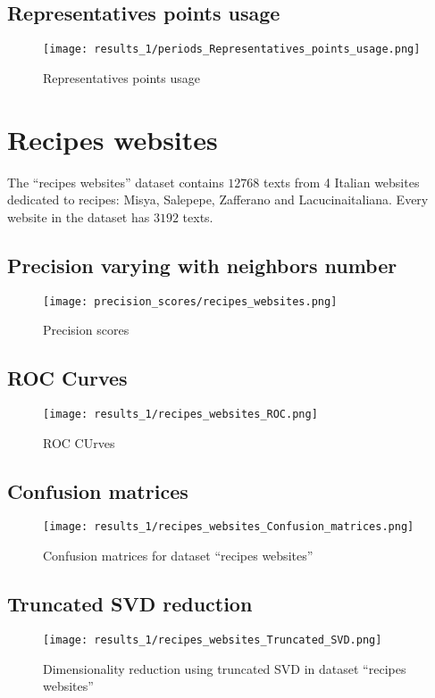\documentclass[\main/main.tex]{subfiles}
\begin{document}
\subsection{Representatives points usage}
\begin{figure}
	\texttt{[image: results\_1/periods\_Representatives\_points\_usage.png]}
	\caption{Representatives points usage}
\end{figure}

\clearpage
\section{Recipes websites}
The ``recipes websites'' dataset contains \(12768\) texts from 4 Italian websites dedicated to recipes: Misya, Salepepe, Zafferano and Lacucinaitaliana. Every website in the dataset has \(3192\) texts.
\subsection{Precision varying with neighbors number}
\begin{figure}
	\texttt{[image: precision\_scores/recipes\_websites.png]}
	\caption{Precision scores}
\end{figure}
\subsection{ROC Curves}
\begin{figure}
	\texttt{[image: results\_1/recipes\_websites\_ROC.png]}
	\caption{ROC CUrves}
\end{figure}
\subsection{Confusion matrices}
\begin{figure}
	\texttt{[image: results\_1/recipes\_websites\_Confusion\_matrices.png]}
	\caption{Confusion matrices for dataset ``recipes websites''}
\end{figure}
\subsection{Truncated SVD reduction}
\begin{figure}
	\texttt{[image: results\_1/recipes\_websites\_Truncated\_SVD.png]}
	\caption{Dimensionality reduction using truncated SVD in dataset ``recipes websites''}
\end{figure}
\end{document}
